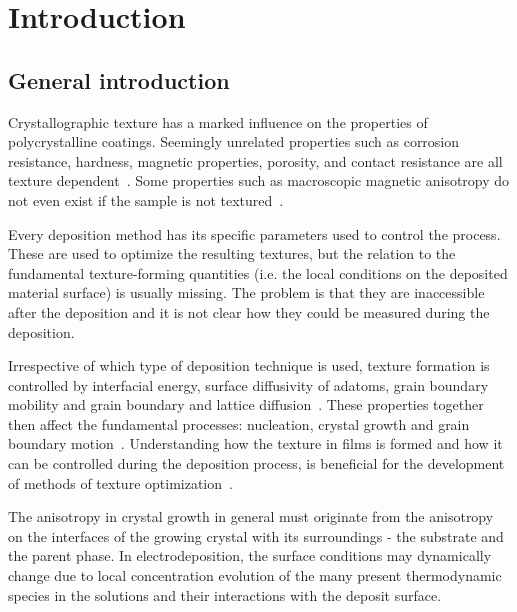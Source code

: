 \chapter{Introduction} \label{ch_introduction}


\section{General introduction}
Crystallographic texture has a marked influence on the properties of polycrystalline coatings. Seemingly unrelated properties such as corrosion resistance, hardness, magnetic properties, porosity, and contact resistance are all texture dependent~\cite{Schlesinger2010}. Some properties such as macroscopic magnetic anisotropy do not even exist if the sample is not textured~\cite{Dinnebier2008}.

Every deposition method has its specific parameters used to control the process. These are used to optimize the resulting textures, but the relation to the fundamental texture-forming quantities (i.e. the local conditions on the deposited material surface) is usually missing. The problem is that they are inaccessible after the deposition and it is not clear how they could be measured during the deposition. 

Irrespective of which type of deposition technique is used, texture formation is controlled by interfacial energy, surface diffusivity of adatoms, grain boundary mobility and grain boundary and lattice diffusion~\cite{Szpunar1997, Suwas2014}. These properties together then affect the fundamental processes: nucleation, crystal growth and grain boundary motion~\cite{Barna1998}. Understanding how the texture in films is formed and how it can be controlled during the deposition process, is beneficial for the development of methods of texture optimization~\cite{Szpunar1997}. 

The anisotropy in crystal growth in general must originate from the anisotropy on the interfaces of the growing crystal with its surroundings - the substrate and the parent phase. In electrodeposition, the surface conditions may dynamically change due to local concentration evolution of the many present thermodynamic species in the solutions and their interactions with the deposit surface. 

